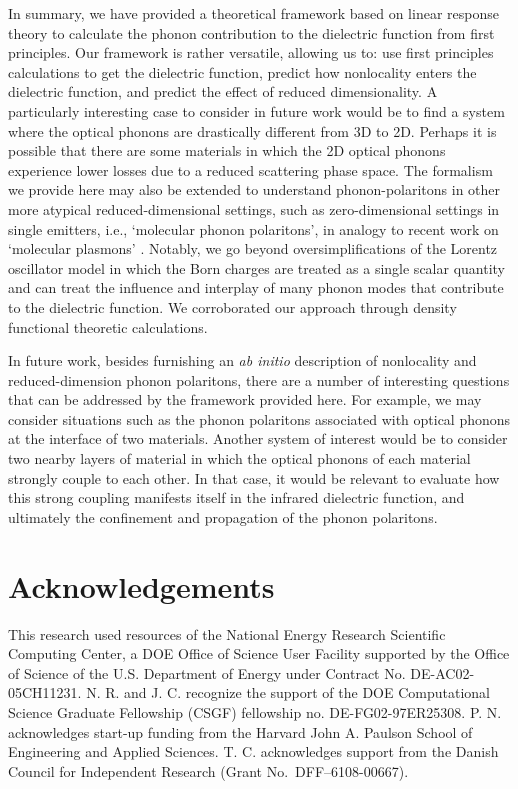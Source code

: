 \documentclass[aps,prb,twocolumn,
	groupedaddress,superscriptaddress,
	amsfonts,amssymb,amsmath,floatfix,
	citeautoscript]{revtex4-1}
\begin{document}
In summary, we have provided a theoretical framework based on linear response theory to calculate the phonon contribution to the dielectric function from first principles.
Our framework is rather versatile, allowing us to: use first principles calculations to get the dielectric function, predict how nonlocality enters the dielectric function, and predict the effect of reduced dimensionality.
A particularly interesting case to consider in future work would be to find a system where the optical phonons are drastically different from 3D to 2D.
Perhaps it is possible that there are some materials in which the 2D optical phonons experience lower losses due to a reduced scattering phase space.
The formalism we provide here may also be extended to understand phonon-polaritons in other more atypical reduced-dimensional settings, such as zero-dimensional settings in single emitters, i.e., `molecular phonon polaritons', in analogy to recent work on `molecular plasmons' \cite{manjavacas2013tunable,lauchner2015molecular}.
Notably, we go beyond oversimplifications of the Lorentz oscillator model in which the Born charges are treated as a single scalar quantity and can treat the influence and interplay of many phonon modes that contribute to the dielectric function.
We corroborated our approach through density functional theoretic calculations.

In future work, besides furnishing an \emph{ab initio} description of nonlocality and reduced-dimension phonon polaritons, there are a number of interesting questions that can be addressed by the framework provided here.
For example, we may consider situations such as the phonon polaritons associated with optical phonons at the interface of two materials.
Another system of interest would be to consider two nearby layers of material in which the optical phonons of each material strongly couple to each other. 
In that case, it would be relevant to evaluate how this strong coupling manifests itself in the infrared dielectric function, and ultimately the confinement and propagation of the phonon polaritons.

\section{Acknowledgements}
This research used resources of the National Energy Research Scientific Computing Center, a DOE Office of Science User Facility supported by the Office of Science of the U.S. Department of Energy under Contract No. DE-AC02-05CH11231. 
N. R. and J. C. recognize the support of the DOE Computational Science Graduate Fellowship (CSGF) fellowship no. DE-FG02-97ER25308. 
P. N. acknowledges start-up funding from the Harvard John A. Paulson School of Engineering and Applied Sciences. 
T. C. acknowledges support from the Danish Council for Independent Research (Grant No.\ DFF--6108-00667).



\end{document}
